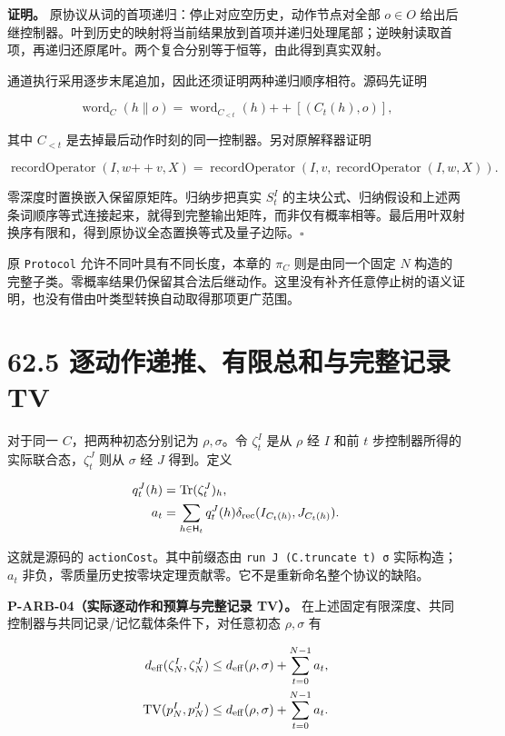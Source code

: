 \documentclass[
  11pt,
  oneside]{book}
\begin{document}
\textbf{证明。} 原协议从词的首项递归：停止对应空历史，动作节点对全部
\(o\in O\)
给出后继控制器。叶到历史的映射将当前结果放到首项并递归处理尾部；逆映射读取首项，再递归还原尾叶。两个复合分别等于恒等，由此得到真实双射。

通道执行采用逐步末尾追加，因此还须证明两种递归顺序相符。源码先证明

\[
\operatorname{word}_{C}(h\|o)
=\operatorname{word}_{C_{<t}}(h)
 \mathbin{+\!+}[(C_t(h),o)],
\]

其中 \(C_{<t}\) 是去掉最后动作时刻的同一控制器。另对原解释器证明

\[
\operatorname{recordOperator}(I,w\mathbin{+\!+}v,X)
=\operatorname{recordOperator}
  (I,v,\operatorname{recordOperator}(I,w,X)).
\]

零深度时置换嵌入保留原矩阵。归纳步把真实 \(S^I_t\)
的主块公式、归纳假设和上述两条词顺序等式连接起来，就得到完整输出矩阵，而非仅有概率相等。最后用叶双射换序有限和，得到原协议全态置换等式及量子边际。\(\square\)

原 \texttt{Protocol} 允许不同叶具有不同长度，本章的 \(\pi_C\)
则是由同一个固定 \(N\)
构造的完整子类。零概率结果仍保留其合法后继动作。这里没有补齐任意停止树的语义证明，也没有借由叶类型转换自动取得那项更广范围。

\section{62.5 逐动作递推、有限总和与完整记录 TV}

对于同一 \(C\)，把两种初态分别记为 \(\rho,\sigma\)。令 \(\zeta^I_t\)
是从 \(\rho\) 经 \(I\) 和前 \(t\)
步控制器所得的实际联合态，\(\zeta^J_t\) 则从 \(\sigma\) 经 \(J\)
得到。定义

\[
\begin{aligned}
q^J_t(h)&=\operatorname{Tr}(\zeta^J_t)_h,\\
a_t&=\sum_{h\in\mathsf H_t}q^J_t(h)
 \delta_{\rm rec}(I_{C_t(h)},J_{C_t(h)}).
\end{aligned}
\]

这就是源码的 \texttt{action\allowbreak Cost}。其中前缀态由
\texttt{run\ J\ (C.\allowbreak truncate\ t)\ σ} 实际构造；\(a_t\)
非负，零质量历史按零块定理贡献零。它不是重新命名整个协议的缺陷。

\protect\hypertarget{p-arb-04}{}{}

\textbf{P-ARB-04（实际逐动作和预算与完整记录 TV）。}
在上述固定有限深度、共同控制器与共同记录/记忆载体条件下，对任意初态
\(\rho,\sigma\) 有

\[
\begin{aligned}
d_{\rm eff}(\zeta^I_N,\zeta^J_N)
&\le d_{\rm eff}(\rho,\sigma)+\sum_{t=0}^{N-1}a_t,\\
\operatorname{TV}(p^I_N,p^J_N)
&\le d_{\rm eff}(\rho,\sigma)+\sum_{t=0}^{N-1}a_t.
\end{aligned}
\]
\end{document}
